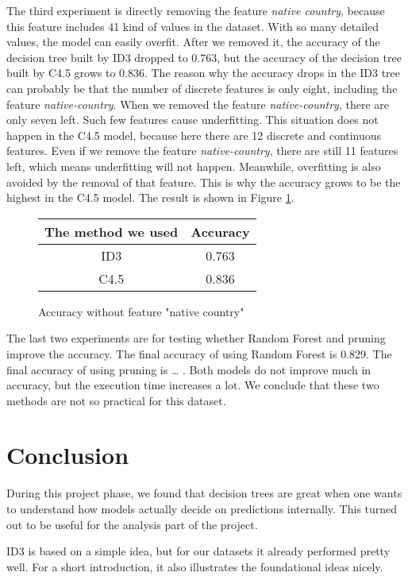 \documentclass[a4paper]{article}
\begin{document}
The third experiment is directly removing the feature \emph{native country}, because this feature includes 41 kind of values in the dataset. With so many detailed values, the model can easily overfit. After we removed it, the accuracy of the decision tree built by ID3 dropped to 0.763, but the accuracy of the decision tree built by C4.5 grows to 0.836. The reason why the accuracy drops in the ID3 tree can probably be that the number of discrete features is only eight, including the feature \emph{native-country}. When we removed the feature \emph{native-country}, there are only seven left. Such few features cause underfitting. This situation does not happen in the C4.5 model, because here there are 12 discrete and continuous features. Even if we remove the feature \emph{native-country}, there are still 11 features left, which means underfitting will not happen. Meanwhile, overfitting is also avoided by the removal of that feature. This is why the accuracy grows to be the highest in the C4.5 model. The result is shown in Figure \ref{fig:withoutnc}.
\begin{figure}[h]
	\centering
    \begin{tabular}{c|c}
    The method we used & Accuracy \\
        \hline
        ID3 & 0.763\\
        \hline
        C4.5 & 0.836\\
    \end{tabular}
    \caption{Accuracy without feature "native country"}
    \label{fig:withoutnc}
\end{figure}

The last two experiments are for testing whether Random Forest and pruning improve the accuracy. The final accuracy of using Random Forest is 0.829. The final accuracy of using pruning is \dots {} . Both models do not improve much in accuracy, but the execution time increases a lot. We conclude that these two methods are not so practical for this dataset.

\section{Conclusion}

During this project phase, we found that decision trees are great when one wants to understand how models actually decide on predictions internally. This turned out to be useful for the analysis part of the project.

ID3 is based on a simple idea, but for our datasets it already performed pretty well. For a short introduction, it also illustrates the foundational ideas nicely.
\end{document}
